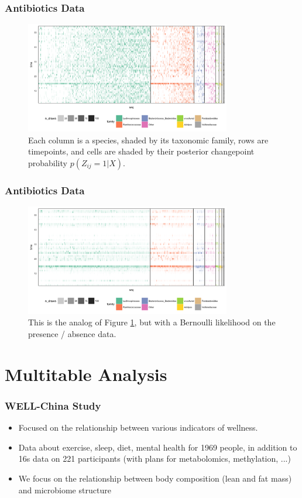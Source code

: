 \documentclass{beamer}
\begin{document}
\begin{frame}
  \frametitle{Antibiotics Data}
 \begin{figure}[ht]
   \centering
   \includegraphics[width=0.8\textwidth]{figure/basic_heatmap}
   \caption{Each column is a species, shaded by its taxonomic family, rows are
     timepoints, and cells are shaded by their posterior changepoint probability
     $p\left(Z_{ij} = 1 \vert X\right)$. \label{fig:basic_heatmap} }
 \end{figure}
\end{frame}

\begin{frame}
  \frametitle{Antibiotics Data}
 \begin{figure}[ht]
   \centering
   \includegraphics[width=0.8\textwidth]{figure/basic_bern_heatmap}
   \caption{This is the analog of Figure \ref{fig:basic_heatmap}, but with a
     Bernoulli likelihood on the presence / absence data.
     \label{fig:basic_bern_heatmap} }
 \end{figure}
\end{frame}

\section{Multitable Analysis}
\label{sec:multitable analysis}

\begin{frame}
  \frametitle{WELL-China Study}
  \begin{itemize}
  \item Focused on the relationship between various indicators of wellness.
  \item Data about exercise, sleep, diet, mental health for 1969 people, in
    addition to 16s data on 221 participants (with plans for metabolomics,
    methylation, ...)
  \item We focus on the relationship between body composition (lean and fat
    mass) and microbiome structure
  \end{itemize}
\end{frame}
\end{document}
